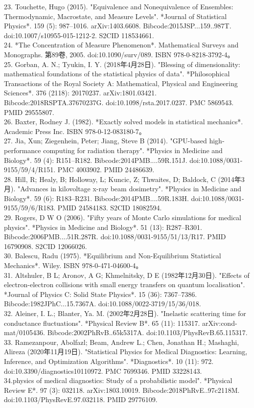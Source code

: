 23. Touchette, Hugo (2015). "Equivalence and Nonequivalence of Ensembles: Thermodynamic, Macrostate, and Measure Levels". *Journal of Statistical Physics*. 159 (5): 987–1016. arXiv:1403.6608. Bibcode:2015JSP...159..987T. doi:10.1007/s10955-015-1212-2. S2CID 118534661.\\
24. *The Concentration of Measure Phenomenon*. Mathematical Surveys and Monographs. 第89卷, 2005. doi:10.1090/surv/089. ISBN 978-0-8218-3792-4。\\
25. Gorban, A. N.; Tyukin, I. Y. (2018年4月28日). "Blessing of dimensionality: mathematical foundations of the statistical physics of data". *Philosophical Transactions of the Royal Society A: Mathematical, Physical and Engineering Sciences*. 376 (2118): 20170237. arXiv:1801.03421. Bibcode:2018RSPTA.37670237G. doi:10.1098/rsta.2017.0237. PMC 5869543. PMID 29555807.\\
26. Baxter, Rodney J. (1982). *Exactly solved models in statistical mechanics*. Academic Press Inc. ISBN 978-0-12-083180-7。\\
27. Jia, Xun; Ziegenhein, Peter; Jiang, Steve B (2014). "GPU-based high-performance computing for radiation therapy". *Physics in Medicine and Biology*. 59 (4): R151–R182. Bibcode:2014PMB....59R.151J. doi:10.1088/0031-9155/59/4/R151. PMC 4003902. PMID 24486639.\\
28. Hill, R; Healy, B; Holloway, L; Kuncic, Z; Thwaites, D; Baldock, C (2014年3月). "Advances in kilovoltage x-ray beam dosimetry". *Physics in Medicine and Biology*. 59 (6): R183–R231. Bibcode:2014PMB....59R.183H. doi:10.1088/0031-9155/59/6/R183. PMID 24584183. S2CID 18082594.\\
29. Rogers, D W O (2006). "Fifty years of Monte Carlo simulations for medical physics". *Physics in Medicine and Biology*. 51 (13): R287–R301. Bibcode:2006PMB....51R.287R. doi:10.1088/0031-9155/51/13/R17. PMID 16790908. S2CID 12066026.\\
30. Balescu, Radu (1975). *Equilibrium and Non-Equilibrium Statistical Mechanics*. Wiley. ISBN 978-0-471-04600-4。\\
31. Altshuler, B L; Aronov, A G; Khmelnitsky, D E (1982年12月30日). "Effects of electron-electron collisions with small energy transfers on quantum localisation". *Journal of Physics C: Solid State Physics*. 15 (36): 7367–7386. Bibcode:1982JPhC...15.7367A. doi:10.1088/0022-3719/15/36/018.\\
32. Aleiner, I. L.; Blanter, Ya. M. (2002年2月28日). "Inelastic scattering time for conductance fluctuations". *Physical Review B*. 65 (11): 115317. arXiv:cond-mat/0105436. Bibcode:2002PhRvB..65k5317A. doi:10.1103/PhysRevB.65.115317.\\
33. Ramezanpour, Abolfazl; Beam, Andrew L.; Chen, Jonathan H.; Mashaghi, Alireza (2020年11月19日). "Statistical Physics for Medical Diagnostics: Learning, Inference, and Optimization Algorithms". *Diagnostics*. 10 (11): 972. doi:10.3390/diagnostics10110972. PMC 7699346. PMID 33228143.\\
34.physics of medical diagnostics: Study of a probabilistic model". *Physical Review E*. 97 (3): 032118. arXiv:1803.10019. Bibcode:2018PhRvE..97c2118M. doi:10.1103/PhysRevE.97.032118. PMID 29776109.\\